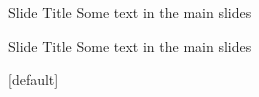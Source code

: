 \documentclass[11pt]{beamer}
\begin{document}
\begin{frame}{Slide Title}
    Some text in the main slides
\end{frame}


\begin{frame}{Slide Title}
    Some text in the main slides
\end{frame}

[default]
\end{document}
